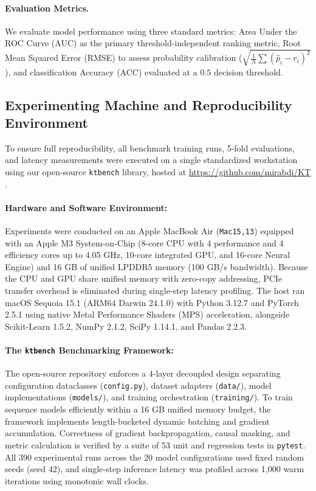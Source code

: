 \documentclass[11pt]{article}
\begin{document}
\paragraph{Evaluation Metrics.}
We evaluate model performance using three standard metrics: Area Under the ROC Curve (AUC) as the primary threshold-independent ranking metric, Root Mean Squared Error (RMSE) to assess probability calibration ($\sqrt{\frac{1}{N}\sum (\hat{p}_i - r_i)^2}$), and classification Accuracy (ACC) evaluated at a $0.5$ decision threshold.

\subsection{Experimenting Machine and Reproducibility Environment}
\label{sec:machine_specs}
To ensure full reproducibility, all benchmark training runs, 5-fold evaluations, and latency measurements were executed on a single standardized workstation using our open-source \texttt{ktbench} library, hosted at \url{https://github.com/mirabdi/KT} \citep{abdimutalipov2024ktbench}.

\paragraph{Hardware and Software Environment:}
Experiments were conducted on an Apple MacBook Air (\texttt{Mac15,13}) equipped with an Apple M3 System-on-Chip (8-core CPU with 4 performance and 4 efficiency cores up to 4.05 GHz, 10-core integrated GPU, and 16-core Neural Engine) and 16 GB of unified LPDDR5 memory (100 GB/s bandwidth). Because the CPU and GPU share unified memory with zero-copy addressing, PCIe transfer overhead is eliminated during single-step latency profiling. The host ran macOS Sequoia 15.1 (ARM64 Darwin 24.1.0) with Python 3.12.7 and PyTorch 2.5.1 using native Metal Performance Shaders (\textsc{MPS}) acceleration, alongside Scikit-Learn 1.5.2, NumPy 2.1.2, SciPy 1.14.1, and Pandas 2.2.3.

\paragraph{The \texttt{ktbench} Benchmarking Framework:}
The open-source repository \citep{abdimutalipov2024ktbench} enforces a 4-layer decoupled design separating configuration dataclasses (\texttt{config.py}), dataset adapters (\texttt{data/}), model implementations (\texttt{models/}), and training orchestration (\texttt{training/}). To train sequence models efficiently within a 16 GB unified memory budget, the framework implements length-bucketed dynamic batching and gradient accumulation. Correctness of gradient backpropagation, causal masking, and metric calculation is verified by a suite of 53 unit and regression tests in \texttt{pytest}. All 390 experimental runs across the 20 model configurations used fixed random seeds (seed 42), and single-step inference latency was profiled across 1,000 warm iterations using monotonic wall clocks.
\end{document}
